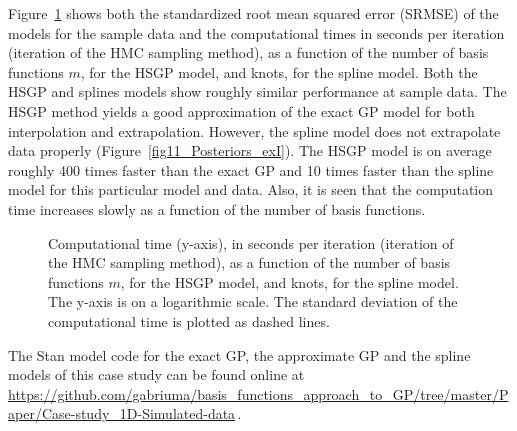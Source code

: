 Figure~\ref{fig14_time_exI} shows both the standardized root mean squared error (SRMSE) of the models for the sample data and the computational times in seconds per iteration (iteration of the HMC sampling method), as a function of the number of basis functions $m$, for the HSGP model, and knots, for the spline model. Both the HSGP and splines models show roughly similar performance at sample data. The HSGP method yields a good approximation of the exact GP model for both interpolation and extrapolation. However, the spline model does not extrapolate data properly (Figure~\ref{fig11_Posteriors_exI}). The HSGP model is on average roughly 400 times faster than the exact GP and 10 times faster than the spline model for this particular model and data. Also, it is seen that the computation time increases slowly as a function of the number of basis functions.

\begin{figure}[!h]
\centering
{}
\caption{Computational time (y-axis), in seconds per iteration (iteration of the HMC sampling method), as a function of the number of basis functions $m$, for the HSGP model, and knots, for the spline model. The y-axis is on a logarithmic scale. The standard deviation of the computational time is plotted as dashed lines.}
  \label{fig14_time_exI}
\end{figure}


The Stan model code for the exact GP, the approximate GP and the spline models of this case study can be found online at {\small \url{ https://github.com/gabriuma/basis_functions_approach_to_GP/tree/master/Paper/Case-study_1D-Simulated-data}}\,.

